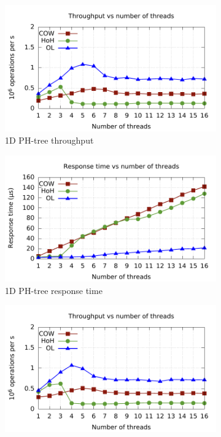 \documentclass[11pt,a4paper]{globis-book}
\begin{document}
\begin{figure}
    \centering
    \begin{subfigure}[b]{0.5\linewidth}
        \includegraphics[scale=0.5]{images/plots/insert1d-tp}
        \caption{1D PH-tree throughput}
    \end{subfigure}%
    \begin{subfigure}[b]{0.5\linewidth}
        \includegraphics[scale=0.5]{images/plots/insert1d-rt}
        \caption{1D PH-tree response time}
    \end{subfigure}
    \begin{subfigure}[b]{0.5\linewidth}
        \includegraphics[scale=0.5]{images/plots/insert2d-tp}

\end{subfigure}
\end{figure}
\end{document}
